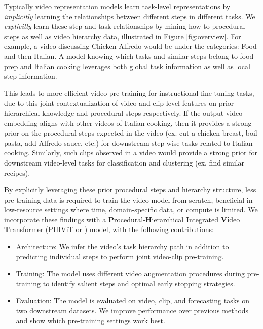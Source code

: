 Typically video representation models learn task-level representations by \emph{implicitly} learning the relationships between different steps in different tasks. We \emph{explicitly} learn these step and task relationships by mining how-to procedural steps as well as video hierarchy data, illustrated in Figure \ref{fig:overview}. For example, a video discussing Chicken Alfredo would be under the categories: Food and then Italian. A model knowing which tasks and similar steps belong to food prep and Italian cooking leverages both global task information as well as local step information. 

This leads to more efficient video pre-training for instructional fine-tuning tasks, due to this joint contextualization of video and clip-level features on prior hierarchical knowledge and procedural steps respectively. If the output video embedding aligns with other videos of Italian cooking, then it provides a strong prior on the procedural steps expected in the video (ex. cut a chicken breast, boil pasta, add Alfredo sauce, etc.) for downstream step-wise tasks related to Italian cooking. Similarly, such clips observed in a video would provide a strong prior for downstream video-level tasks for classification and clustering (ex. find similar recipes). 

By explicitly leveraging these prior procedural steps and hierarchy structure, less pre-training data is required to train the video model from scratch, beneficial in low-resource settings where time, domain-specific data, or compute is limited. We incorporate these findings with a \underline{\textbf{P}}rocedural-\underline{\textbf{H}}ierarchical \underline{\textbf{I}}ntegrated \underline{\textbf{Vi}}deo \underline{\textbf{T}}ransformer (PHIViT or \model) model, with the following contributions:
\begin{itemize}
    \item Architecture: We infer the video's task hierarchy path in addition to predicting individual steps to perform joint video-clip pre-training. 
    \item Training: The model uses different video augmentation procedures during pre-training to identify salient steps and optimal early stopping strategies. 
    \item Evaluation: The model is evaluated on video, clip, and forecasting tasks on two downstream datasets. We improve performance over previous methods and show which \model{} pre-training settings work best.
\end{itemize}